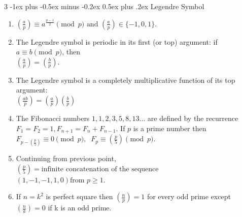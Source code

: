 \documentclass[8pt,a4paper,onesided]{article}
\makeatletter
\renewcommand{\subsection}{\@startsection{subsection}{2}{0mm}
    {-1ex plus -0.5ex minus -0.2ex} %
    {0.5ex plus .2ex}                %
    {\normalfont\large\bfseries}}    %
\makeatother
\begin{document}
\begin{multicols}{3}
  \subsection{Legendre Symbol}
  \begin{enumerate}[resume]
    \item $\displaystyle \left(\frac{a}{p}\right)\equiv a^{\frac{p-1}{2}} \pmod{p} \text{ and } \left(\frac{a}{p}\right)\in\{-1,0,1\}.$
    \item The Legendre symbol is periodic in its first (or top) argument: if $\displaystyle a \equiv b \pmod{p}$, then \\
    $\displaystyle \left(\frac{a}{p}\right)=\left(\frac{b}{p}\right).$
    \item The Legendre symbol is a completely multiplicative function of its top argument: \\
    $\displaystyle \left(\frac{ab}{p} \right) = \left(\frac{a}{p} \right) \left(\frac{b}{p} \right)$
    \item The Fibonacci numbers $\displaystyle 1,1,2,3,5,8,13\dots$ are defined by the recurrence $\displaystyle F_1 = F_2 = 1,F_{n+1} = F_n + F_{n-1}.$ If $\displaystyle p$ is a prime number then \\
    $\displaystyle F_{p-\left(\frac{p}{5}\right)} \equiv 0 {\pmod{p}}, \;\;F_p \equiv \left(\frac{p}{5}\right) {\pmod{p}}.$
    \item Continuing from previous point, \\
    $\displaystyle \left(\frac{p}{5}\right)= \text{infinite concatenation of the sequence}$ \\
    $\left(1,-1,-1,1,0\right) {\text{from }}p \geq 1$.
    \item If $n = k^2$ is perfect square then $\displaystyle \left(\frac{n}{p}\right)=1$ for every odd prime except $\displaystyle \left(\frac{n}{k}\right)=0$ if k is an odd prime.
    \end{enumerate}

\end{multicols}
\end{document}
